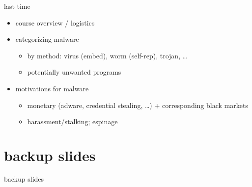 \date{}
\title{}
\date{}

\begin{frame}
    \titlepage
\end{frame}

\begin{frame}{last time}
    \begin{itemize}
    \item course overview / logistics
    \item categorizing malware
        \begin{itemize}
        \item by method: virus (embed), worm (self-rep), trojan, \ldots
        \item potentially unwanted programs
        \end{itemize}
    \item motivations for malware
        \begin{itemize}
        \item monetary (adware, credential stealing, \ldots) + corresponding black markets
        \item harassment/stalking; espinage
        \end{itemize}
    \end{itemize}
\end{frame}







\section{backup slides}
\begin{frame}{backup slides}
\end{frame}




